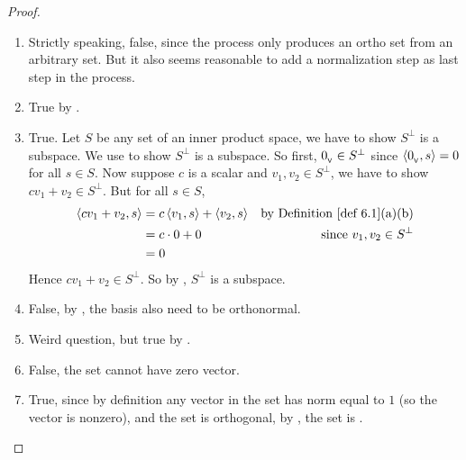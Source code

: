 \begin{proof} \ 

\begin{enumerate}
\item Strictly speaking, false, since the process only produces an ortho set from an arbitrary \LID{} set.
But it also seems reasonable to add a normalization step as last step in the process.

\item True by .

\item True.
Let \(S\) be any set of an inner product space, we have to show \(S^{\perp}\) is a subspace.
We use  to show \(S^{\perp}\) is a subspace.
So first, \(0_{_{\textsf{V}}} \in S^{\perp}\) since \(\left< 0_{_{\textsf{V}}}, s \right> = 0\) for all \(s \in S\).
Now suppose \(c\) is a scalar and \(v_1, v_2 \in S^{\perp}\), we have to show \(c v_1 + v_2 \in S^{\perp}\).
But for all \(s \in S\),
\begin{align*}
    \LG c v_1 + v_2, s \RG & = c \LG v_1, s \RG + \LG v_2, s \RG & \text{by \DEF{6.1}(a)(b)} \\
        & = c \cdot 0 + 0 & \text{since \(v_1, v_2 \in S^{\perp}\)} \\
        & = 0
\end{align*}
Hence \(c v_1 + v_2 \in S^{\perp}\).
So by , \(S^{\perp}\) is a subspace.

\item False, by , the basis also need to be orthonormal.

\item Weird question, but true by .

\item False, the set cannot have zero vector.

\item True, since by definition any vector in the set has norm equal to \(1\) (so the vector is nonzero), and the set is orthogonal, by , the set is \LID{}.
\end{enumerate}
\end{proof}

